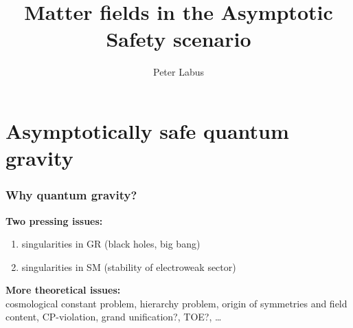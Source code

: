 \documentclass{beamer}
\begin{document}
\title{Matter fields in the Asymptotic Safety scenario}
\author{Peter Labus}
\begin{frame}
	\titlepage
\end{frame}



\fontsize{8pt}{7.2}\selectfont

\section{Asymptotically safe quantum gravity}

\begin{frame}
  \frametitle{Why quantum gravity?}
  \textbf{Two pressing issues:}
  \begin{enumerate}
    \item singularities in GR (black holes, big bang)
      \hspace{2cm}
    \item singularities in SM (stability of electroweak sector)
      \hspace{1cm}
  \end{enumerate}
  \vfill
  \pause
  \textbf{More theoretical issues:}\\[5pt]
  cosmological constant problem, hierarchy problem, origin of symmetries and field content,
  CP-violation, grand unification?, TOE?, \dots
\end{frame}
\end{document}
